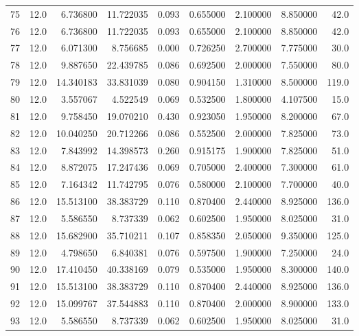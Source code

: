 \begin{tabular}{lrrrrrrrr}
75   &   12.0 &   6.736800 &  11.722035 &  0.093 &  0.655000 &  2.100000 &   8.850000 &   42.0 \\
76   &   12.0 &   6.736800 &  11.722035 &  0.093 &  0.655000 &  2.100000 &   8.850000 &   42.0 \\
77   &   12.0 &   6.071300 &   8.756685 &  0.000 &  0.726250 &  2.700000 &   7.775000 &   30.0 \\
78   &   12.0 &   9.887650 &  22.439785 &  0.086 &  0.692500 &  2.000000 &   7.550000 &   80.0 \\
79   &   12.0 &  14.340183 &  33.831039 &  0.080 &  0.904150 &  1.310000 &   8.500000 &  119.0 \\
80   &   12.0 &   3.557067 &   4.522549 &  0.069 &  0.532500 &  1.800000 &   4.107500 &   15.0 \\
81   &   12.0 &   9.758450 &  19.070210 &  0.430 &  0.923050 &  1.950000 &   8.200000 &   67.0 \\
82   &   12.0 &  10.040250 &  20.712266 &  0.086 &  0.552500 &  2.000000 &   7.825000 &   73.0 \\
83   &   12.0 &   7.843992 &  14.398573 &  0.260 &  0.915175 &  1.900000 &   7.825000 &   51.0 \\
84   &   12.0 &   8.872075 &  17.247436 &  0.069 &  0.705000 &  2.400000 &   7.300000 &   61.0 \\
85   &   12.0 &   7.164342 &  11.742795 &  0.076 &  0.580000 &  2.100000 &   7.700000 &   40.0 \\
86   &   12.0 &  15.513100 &  38.383729 &  0.110 &  0.870400 &  2.440000 &   8.925000 &  136.0 \\
87   &   12.0 &   5.586550 &   8.737339 &  0.062 &  0.602500 &  1.950000 &   8.025000 &   31.0 \\
88   &   12.0 &  15.682900 &  35.710211 &  0.107 &  0.858350 &  2.050000 &   9.350000 &  125.0 \\
89   &   12.0 &   4.798650 &   6.840381 &  0.076 &  0.597500 &  1.900000 &   7.250000 &   24.0 \\
90   &   12.0 &  17.410450 &  40.338169 &  0.079 &  0.535000 &  1.950000 &   8.300000 &  140.0 \\
91   &   12.0 &  15.513100 &  38.383729 &  0.110 &  0.870400 &  2.440000 &   8.925000 &  136.0 \\
92   &   12.0 &  15.099767 &  37.544883 &  0.110 &  0.870400 &  2.000000 &   8.900000 &  133.0 \\
93   &   12.0 &   5.586550 &   8.737339 &  0.062 &  0.602500 &  1.950000 &   8.025000 &   31.0 \\

\end{tabular}
